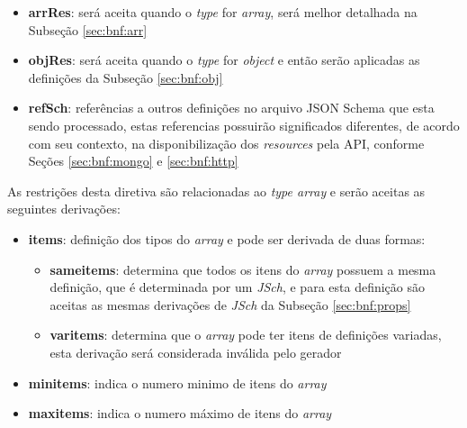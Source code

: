 \begin{itemize}
    \item \textbf{arrRes}: será aceita quando o \textit{type} for \textit{array}, será melhor detalhada na Subseção \ref{sec:bnf:arr}
    
    \item \textbf{objRes}: será aceita quando o \textit{type} for \textit{object} e então serão aplicadas as definições da Subseção \ref{sec:bnf:obj}
    
    \item \textbf{refSch}: referências a outros definições no arquivo JSON Schema que esta sendo processado, estas referencias possuirão significados diferentes, de acordo com seu contexto, na disponibilização dos \textit{resources} pela API, conforme Seções \ref{sec:bnf:mongo} e \ref{sec:bnf:http}
\end{itemize}

\label{sec:bnf:arr}
As restrições desta diretiva são relacionadas ao \textit{type array} e serão aceitas as seguintes derivações:
\begin{itemize}
    \item \textbf{items}: definição dos tipos do \textit{array} e pode ser derivada de duas formas:
    \begin{itemize}
        \item \textbf{sameitems}: determina que todos os itens do \textit{array} possuem a mesma definição, que é determinada por um \textit{JSch}, e para esta definição são aceitas as mesmas derivações de \textit{JSch} da Subseção \ref{sec:bnf:props}
        
        \item \textbf{varitems}: determina que o \textit{array} pode ter itens de definições variadas, esta derivação será considerada inválida pelo gerador
        
    \end{itemize}
    
    
    \item \textbf{minitems}: indica o numero minimo de itens do \textit{array}
    
    \item \textbf{maxitems}: indica o numero máximo de itens do \textit{array}
\end{itemize}


